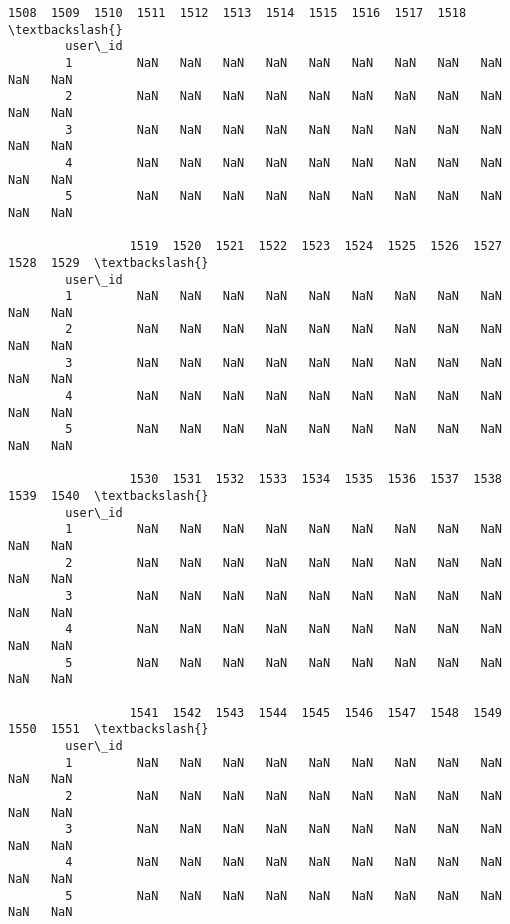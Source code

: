 \documentclass[11pt]{article}
\begin{document}
\begin{Verbatim}[commandchars=\\\{\}]
                 1508  1509  1510  1511  1512  1513  1514  1515  1516  1517  1518  \textbackslash{}
        user\_id                                                                     
        1         NaN   NaN   NaN   NaN   NaN   NaN   NaN   NaN   NaN   NaN   NaN   
        2         NaN   NaN   NaN   NaN   NaN   NaN   NaN   NaN   NaN   NaN   NaN   
        3         NaN   NaN   NaN   NaN   NaN   NaN   NaN   NaN   NaN   NaN   NaN   
        4         NaN   NaN   NaN   NaN   NaN   NaN   NaN   NaN   NaN   NaN   NaN   
        5         NaN   NaN   NaN   NaN   NaN   NaN   NaN   NaN   NaN   NaN   NaN   
        
                 1519  1520  1521  1522  1523  1524  1525  1526  1527  1528  1529  \textbackslash{}
        user\_id                                                                     
        1         NaN   NaN   NaN   NaN   NaN   NaN   NaN   NaN   NaN   NaN   NaN   
        2         NaN   NaN   NaN   NaN   NaN   NaN   NaN   NaN   NaN   NaN   NaN   
        3         NaN   NaN   NaN   NaN   NaN   NaN   NaN   NaN   NaN   NaN   NaN   
        4         NaN   NaN   NaN   NaN   NaN   NaN   NaN   NaN   NaN   NaN   NaN   
        5         NaN   NaN   NaN   NaN   NaN   NaN   NaN   NaN   NaN   NaN   NaN   
        
                 1530  1531  1532  1533  1534  1535  1536  1537  1538  1539  1540  \textbackslash{}
        user\_id                                                                     
        1         NaN   NaN   NaN   NaN   NaN   NaN   NaN   NaN   NaN   NaN   NaN   
        2         NaN   NaN   NaN   NaN   NaN   NaN   NaN   NaN   NaN   NaN   NaN   
        3         NaN   NaN   NaN   NaN   NaN   NaN   NaN   NaN   NaN   NaN   NaN   
        4         NaN   NaN   NaN   NaN   NaN   NaN   NaN   NaN   NaN   NaN   NaN   
        5         NaN   NaN   NaN   NaN   NaN   NaN   NaN   NaN   NaN   NaN   NaN   
        
                 1541  1542  1543  1544  1545  1546  1547  1548  1549  1550  1551  \textbackslash{}
        user\_id                                                                     
        1         NaN   NaN   NaN   NaN   NaN   NaN   NaN   NaN   NaN   NaN   NaN   
        2         NaN   NaN   NaN   NaN   NaN   NaN   NaN   NaN   NaN   NaN   NaN   
        3         NaN   NaN   NaN   NaN   NaN   NaN   NaN   NaN   NaN   NaN   NaN   
        4         NaN   NaN   NaN   NaN   NaN   NaN   NaN   NaN   NaN   NaN   NaN   
        5         NaN   NaN   NaN   NaN   NaN   NaN   NaN   NaN   NaN   NaN   NaN   
        

\end{Verbatim}
\end{document}

